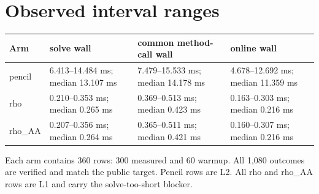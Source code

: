 \documentclass[10pt]{article}
\begin{document}
\section*{Observed interval ranges}
\begin{longtable}{llll}
\toprule Arm & solve wall & common method-call wall & online wall \\ \midrule
pencil & 6.413--14.484 ms; median 13.107 ms & 7.479--15.533 ms; median 14.178 ms & 4.678--12.692 ms; median 11.359 ms \\
rho & 0.210--0.353 ms; median 0.265 ms & 0.369--0.513 ms; median 0.423 ms & 0.163--0.303 ms; median 0.216 ms \\
rho\_AA & 0.207--0.356 ms; median 0.264 ms & 0.365--0.511 ms; median 0.421 ms & 0.160--0.307 ms; median 0.216 ms \\
\bottomrule\end{longtable}
Each arm contains 360 rows: 300 measured and 60 warmup. All 1,080 outcomes are verified and match the public target. Pencil rows are L2. All rho and rho\_AA rows are L1 and carry the solve-too-short blocker.
\end{document}

